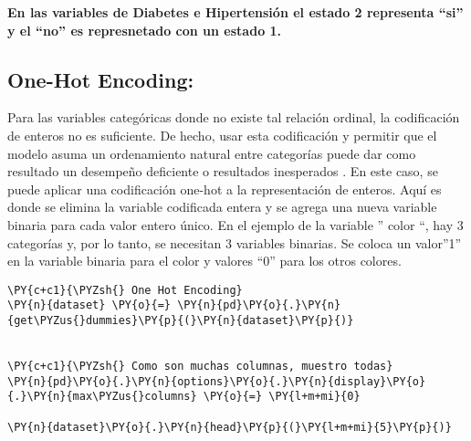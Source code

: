     \textbf{En las variables de Diabetes e Hipertensión el estado 2
representa ``si'' y el ``no'' es represnetado con un estado 1.}

    \hypertarget{one-hot-encoding}{%
\subsection{One-Hot Encoding:}\label{one-hot-encoding}}

Para las variables categóricas donde no existe tal relación ordinal, la
codificación de enteros no es suficiente. De hecho, usar esta
codificación y permitir que el modelo asuma un ordenamiento natural
entre categorías puede dar como resultado un desempeño deficiente o
resultados inesperados \cite{Bank1993}. En este caso, se
puede aplicar una codificación one-hot a la representación de enteros.
Aquí es donde se elimina la variable codificada entera y se agrega una
nueva variable binaria para cada valor entero único. En el ejemplo de la
variable '' color ``, hay 3 categorías y, por lo tanto, se necesitan 3
variables binarias. Se coloca un valor''1'' en la variable binaria para
el color y valores ``0'' para los otros colores.

    \begin{tcolorbox}[breakable, size=fbox, boxrule=1pt, pad at break*=1mm,colback=cellbackground, colframe=cellborder]
\begin{Verbatim}[commandchars=\\\{\}]
\PY{c+c1}{\PYZsh{} One Hot Encoding}
\PY{n}{dataset} \PY{o}{=} \PY{n}{pd}\PY{o}{.}\PY{n}{get\PYZus{}dummies}\PY{p}{(}\PY{n}{dataset}\PY{p}{)}


\PY{c+c1}{\PYZsh{} Como son muchas columnas, muestro todas}
\PY{n}{pd}\PY{o}{.}\PY{n}{options}\PY{o}{.}\PY{n}{display}\PY{o}{.}\PY{n}{max\PYZus{}columns} \PY{o}{=} \PY{l+m+mi}{0}

\PY{n}{dataset}\PY{o}{.}\PY{n}{head}\PY{p}{(}\PY{l+m+mi}{5}\PY{p}{)}
\end{Verbatim}
\end{tcolorbox}


